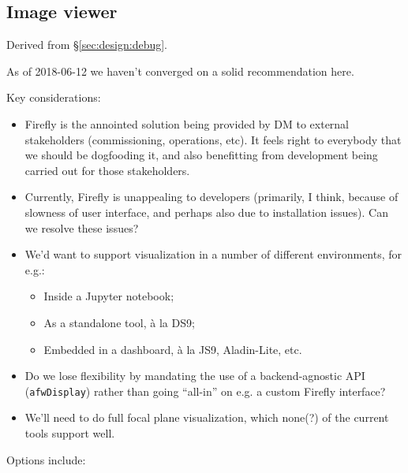 \subsection{Image viewer}
\label{sec:comp:image}


Derived from \S\ref{sec:design:debug}.

As of 2018-06-12 we haven't converged on a solid recommendation here.

Key considerations:

\begin{itemize}

  \item{Firefly is the annointed solution being provided by DM to external
  stakeholders (commissioning, operations, etc). It feels right to everybody
  that we should be dogfooding it, and also benefitting from development being
  carried out for those stakeholders.}

  \item{Currently, Firefly is unappealing to developers (primarily, I think,
  because of slowness of user interface, and perhaps also due to installation
  issues). Can we resolve these issues?}

  \item{We'd want to support visualization in a number of different
  environments, for e.g.:

    \begin{itemize}

      \item{Inside a Jupyter notebook;}
      \item{As a standalone tool, \`a la DS9;}
      \item{Embedded in a \gls{dashboard}, \`a la JS9, Aladin-Lite, etc.}

    \end{itemize}
  }

  \item{Do we lose flexibility by mandating the use of a backend-agnostic API
  (\texttt{afwDisplay}) rather than going ``all-in'' on e.g. a custom Firefly
  interface?}

  \item{We'll need to do full focal plane visualization, which none(?) of the
  current tools support well.}

\end{itemize}

Options include:

